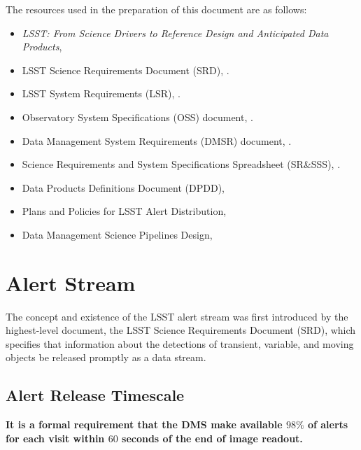 \documentclass[DM,authoryear,toc]{lsstdoc}
\begin{document}
The resources used in the preparation of this document are as follows:
\begin{itemize}
\item {\it LSST: From Science Drivers to Reference Design and Anticipated Data Products}, \citet{2008arXiv0805.2366I}
\item LSST Science Requirements Document (SRD), .
\item LSST System Requirements (LSR), .
\item Observatory System Specifications (OSS) document, .
\item Data Management System Requirements (DMSR) document, .
\item Science Requirements and System Specifications Spreadsheet (SR\&SSS), .
\item Data Products Definitions Document (DPDD), 
\item Plans and Policies for LSST Alert Distribution, 
\item Data Management Science Pipelines Design, 
\end{itemize}

\section{Alert Stream} \label{sec:alerts}

The concept and existence of the LSST alert stream was first introduced by the highest-level document, the LSST Science Requirements Document (SRD), which specifies that information about the detections of transient, variable, and moving objects be released promptly as a data stream. 

\subsection{Alert Release Timescale}\label{ssec:OTT1}

{\bf It is a formal requirement that the DMS make available $98\%$ of alerts for each visit within $60$ seconds of the end of image readout.}
\end{document}
